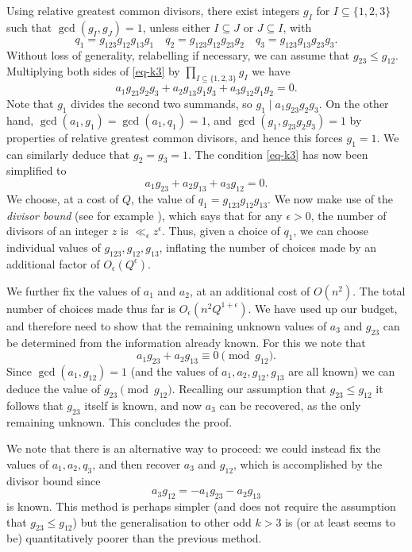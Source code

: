 \documentclass[11pt,letterpaper]{amsart}
\newcommand{\ogcd}[2]{\gcd(#1,#2)}
\theoremstyle{definition}
\begin{document}
Using relative greatest common divisors, there exist integers $g_I$ for $I\subseteq\{1,2,3\}$ such that $\ogcd{g_I}{g_J}=1$, unless either $I\subseteq J$ or $J\subseteq I$, with
\[q_1=g_{123}g_{12}g_{13}g_1\quad q_2=g_{123}g_{12}g_{23}g_2\quad q_3=g_{123}g_{13}g_{23}g_3.\]
Without loss of generality, relabelling if necessary, we can assume that $g_{23}\leq g_{12}$. Multiplying both sides of \eqref{eq-k3} by $\prod_{I\subseteq \{1,2,3\}}g_I$ we have
\[a_1g_{23}g_{2}g_3+a_2g_{13}g_1g_3+a_3g_{12}g_1g_2=0.\]
Note that $g_1$ divides the second two summands, so $g_1\mid a_1g_{23}g_2g_3$. On the other hand, $\ogcd{a_1}{g_1}=\ogcd{a_1}{q_1}=1$, and $\ogcd{g_1}{g_{23}g_2g_3}=1$ by properties of relative greatest common divisors, and hence this forces $g_1=1$. We can similarly deduce that $g_2=g_3=1$. The condition \eqref{eq-k3} has now been simplified to
\[a_1g_{23}+a_2g_{13}+a_3g_{12}=0.\]
We choose, at a cost of $Q$, the value of $q_1=g_{123}g_{12}g_{13}$. We now make use of the \emph{divisor bound} (see for example \cite[equation (2.20)]{MV06}), which says that for any $\epsilon > 0$, the number of divisors of an integer $z$ is $\ll_\epsilon z^\epsilon$. Thus, given a choice of $q_1$, we can choose individual values of $g_{123}, g_{12}, g_{13}$, inflating the number of choices made by an additional factor of $O_\epsilon(Q^\epsilon)$. 

We further fix the values of $a_1$ and $a_2$, at an additional cost of $O(n^2)$. The total number of choices made thus far is $O_\epsilon(n^2Q^{1+\epsilon})$. We have used up our budget, and therefore need to show that the remaining unknown values of $a_3$ and $g_{23}$ can be determined from the information already known. For this we note that 
\[a_1g_{23}+a_2g_{13}\equiv 0\pmod{g_{12}}.\]
Since $\ogcd{a_1}{g_{12}}=1$ (and the values of $a_1,a_2,g_{12},g_{13}$ are all known) we can deduce the value of $g_{23}\pmod{g_{12}}$. Recalling our assumption that $g_{23}\leq g_{12}$ it follows that $g_{23}$ itself is known, and now $a_3$ can be recovered, as the only remaining unknown. This concludes the proof.

We note that there is an alternative way to proceed: we could instead fix the values of $a_1,a_2,q_3$, and then recover $a_3$ and $g_{12}$, which is accomplished by the divisor bound since
\[a_3g_{12}=-a_1g_{23}-a_2g_{13}\]
is known. This method is perhaps simpler (and does not require the assumption that $g_{23}\leq g_{12}$) but the generalisation to other odd $k>3$ is (or at least seems to be) quantitatively poorer than the previous method.
\end{document}

